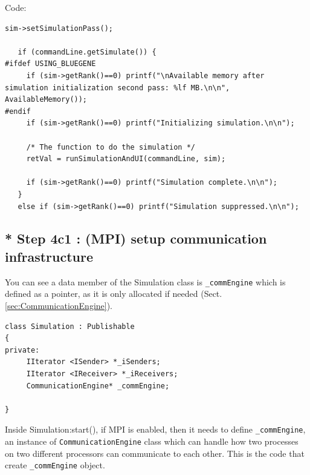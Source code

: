 Code:
{\tiny
\begin{verbatim}
sim->setSimulationPass(); 

   if (commandLine.getSimulate()) {
#ifdef USING_BLUEGENE
     if (sim->getRank()==0) printf("\nAvailable memory after simulation initialization second pass: %lf MB.\n\n", AvailableMemory());
#endif 
     if (sim->getRank()==0) printf("Initializing simulation.\n\n");
   
     /* The function to do the simulation */  
     retVal = runSimulationAndUI(commandLine, sim);
     
     if (sim->getRank()==0) printf("Simulation complete.\n\n");
   }
   else if (sim->getRank()==0) printf("Simulation suppressed.\n\n");
\end{verbatim}
}

\subsection{* Step 4c1 : (MPI) setup communication infrastructure}
\label{sec:GSL-simulations-part-setup-commEngine}

You can see a data member of the Simulation class is \verb!_commEngine! which is
defined as a pointer, as it is only allocated if needed
(Sect.\ref{sec:CommunicationEngine}).

\begin{verbatim}
class Simulation : Publishable
{
private:
 	 IIterator <ISender> *_iSenders;                                                                                                                    
     IIterator <IReceiver> *_iReceivers;          
	 CommunicationEngine* _commEngine;
	 
}     
\end{verbatim}

Inside Simulation:start(), if MPI is enabled, then it needs to define 
\verb!_commEngine!, an instance of \verb!CommunicationEngine! class
which can handle how two processes on two different processors can communicate
to each other. This is the code that create
\verb!_commEngine! object.

